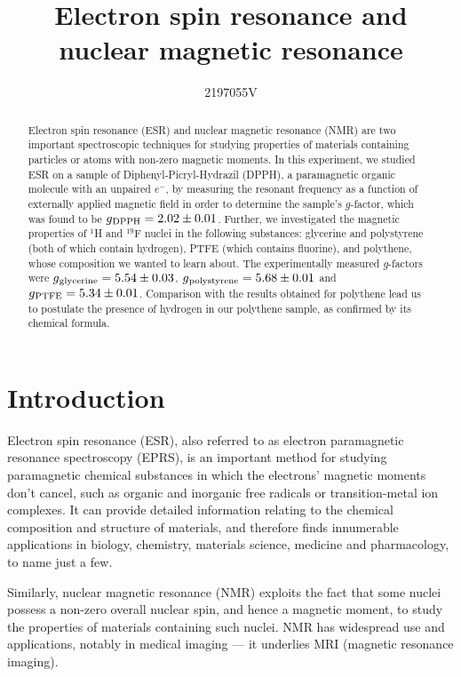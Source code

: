 \documentclass[a4paper]{jpconf}
\numberwithin{equation}{section}
\begin{document}
\title{Electron spin resonance and nuclear magnetic resonance}

\author{2197055V}


\begin{abstract}
Electron spin resonance (ESR) and nuclear magnetic resonance (NMR) are two important spectroscopic techniques for studying properties of materials containing particles or atoms with non-zero magnetic moments. In this experiment, we studied ESR on a sample of Diphenyl-Picryl-Hydrazil (DPPH), a paramagnetic organic molecule with an unpaired $e^-$, by measuring the resonant frequency as a function of externally applied magnetic field in order to determine the sample\textquoteright s $g$-factor, which was found to be $g\textsubscript{DPPH} = 2.02 \pm 0.01$.
Further, we investigated the magnetic properties of ${}^1$H and ${}^{19}$F nuclei in the following substances: glycerine and polystyrene (both of which contain hydrogen), PTFE (which contains fluorine), and polythene, whose composition we wanted to learn about. The experimentally measured $g$-factors were $g\textsubscript{glycerine} = 5.54 \pm 0.03$, $g\textsubscript{polystyrene} = 5.68 \pm 0.01$ and $g\textsubscript{PTFE} = 5.34 \pm 0.01$. Comparison with the results obtained for polythene lead us to postulate the presence of hydrogen in our polythene sample, as confirmed by its chemical formula.

\end{abstract}

\section{Introduction}
Electron spin resonance (ESR), also referred to as electron paramagnetic resonance spectroscopy      %
(EPRS), is an important method for studying paramagnetic chemical substances in which the electrons' magnetic moments don't cancel, such as organic and inorganic free radicals or transition-metal ion complexes. It can provide detailed information relating to the chemical composition and structure of materials, and therefore finds innumerable applications in biology, chemistry, materials science, medicine and pharmacology, to name just a few.

Similarly, nuclear magnetic resonance (NMR) exploits the fact that some nuclei possess a non-zero overall nuclear spin, and hence a magnetic moment, to study the properties of materials containing such nuclei. NMR has widespread use and applications, notably in medical imaging --- it underlies MRI (magnetic resonance imaging).
\end{document}
